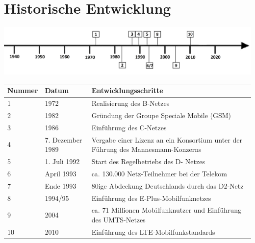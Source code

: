 \section*{Historische Entwicklung}
\includegraphics[width=\textwidth]{Kapitel/DNetz/Grafiken/Zeitstrahl}
\par
\noindent
\begin{tabular}{|p{1 cm}|p{3 cm}|p{13.55 cm}|}
	\hline
	Nummer & Datum & Entwicklungsschritte~\cite{vorlage.3}\\
	\hline
	1 & 1972 & Realisierung des B-Netzes\\
	\hline
	2 & 1982 & Gründung der Groupe Speciale Mobile (GSM)\\
	\hline
	3 & 1986 & Einführung des C-Netzes\\
	\hline
	4 & 7. Dezember 1989 & Vergabe einer Lizenz an ein Konsortium unter der Führung des Mannesmann-Konzerns\\
	\hline
	5 & 1. Juli 1992 & Start des Regelbetriebs des D- Netzes\\
	\hline
	6 & April 1993 & ca. 130.000 Netz-Teilnehmer bei der Telekom\\
	\hline
	7 & Ende 1993 & 80ige Abdeckung Deutschlands durch das D2-Netz\\
	\hline
	8 & 1994/95 &  Einführung des E-Plus-Mobilfunknetzes\\
	\hline
	9  & 2004 &  ca. 71 Millionen Mobilfunknutzer und Einführung des UMTS-Netzes\\
	\hline
	10 & 2010 & Einführung des LTE-Mobilfunkstandards\\
	\hline
\end{tabular}
\par
